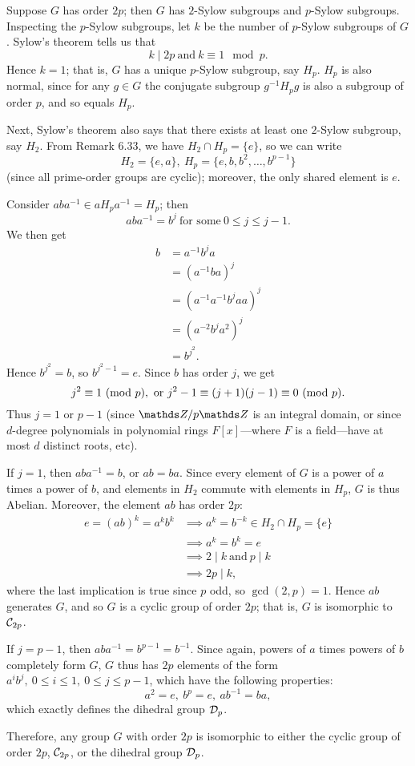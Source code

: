 \documentclass{homework}
\begin{document}
\begin{solution}
  Suppose $G$ has order $2p$; then $G$ has $2$-Sylow subgroups and $p$-Sylow subgroups. Inspecting
  the $p$-Sylow subgroups, let $k$ be the number of $p$-Sylow subgroups of $G$. Sylow's theorem
  tells us that \[
    k\mid 2p ~\text{and}~k\equiv 1\mod{p}
  .\] Hence $k=1$; that is, $G$ has a unique $p$-Sylow subgroup, say $H_p$. $H_p$ is also normal,
  since for any $g\in G$ the conjugate subgroup $g^{-1}H_pg$ is also a subgroup of order $p$, and so
  equals $H_p$.

  Next, Sylow's theorem also says that there exists at least one $2$-Sylow subgroup, say $H_2$. From
  Remark 6.33, we have $H_2\cap H_p=\{ e \}$, so we can write \[
    H_2=\{ e,a \},\ H_p=\{ e,b,b^2,\ldots,b^{p-1} \}
  \] (since all prime-order groups are cyclic); moreover, the only shared element is $e$.

  Consider $aba^{-1}\in aH_pa^{-1}=H_p$; then \[
    aba^{-1}=b^{j}~\text{for some}~0\le j\le j-1
  .\] We then get
  \begin{align*}
    b&= a^{-1}b^ja \\
     &= (a^{-1}ba)^j \\
     &= (a^{-1}a^{-1}b^jaa)^j \\
     &= (a^{-2}b^ja^2)^j \\
     &= b^{j^2}
  .\end{align*}
  Hence $b^{j^2}=b$, so $b^{j^2-1}=e$. Since $b$ has order $j$, we get \[
    j^2\equiv 1\ (\mathrm{mod}\ p), ~\text{or}~j^2-1\equiv (j+1)(j-1)\equiv 0\ (\mathrm{mod}\ p)
  .\] Thus $j=1$ or $p-1$ (since $\Z /p\Z$ is an integral domain, or since $d$-degree polynomials in
  polynomial rings $F[x]$---where $F$ is a field---have at most $d$ distinct roots, etc).

  If $j=1$, then $aba^{-1}=b$, or $ab=ba$. Since every element of $G$ is a power of $a$ times a
  power of $b$, and elements in $H_2$ commute with elements in $H_p$, $G$ is thus Abelian. Moreover,
  the element $ab$ has order $2p$:
  \begin{align*}
    e=(ab)^k=a^kb^k&\implies a^k=b^{-k}\in H_2\cap H_p=\{ e \}\\
                   &\implies a^k=b^k=e\\
                   &\implies 2\mid k~\text{and}~p\mid k\\
                   &\implies 2p\mid k
  ,\end{align*} where the last implication is true since $p$ odd, so $\gcd{(2,p)}=1$. Hence $ab$
  generates $G$, and so $G$ is a cyclic group of order $2p$; that is, $G$ is isomorphic to
  $\mathcal{C}_{2p}$.

  If $j=p-1$, then $aba^{-1}=b^{p-1}=b^{-1}$. Since again, powers of $a$ times powers of $b$
  completely form $G$, $G$ thus has $2p$ elements of the form $a^ib^j,\ 0\le i\le 1,\ 0\le j\le
  p-1$, which have the following properties: \[
    a^2=e,\ b^p=e,\ ab^{-1}=ba
  ,\] which exactly defines the dihedral group $\mathcal{D}_p$.

  Therefore, any group $G$ with order $2p$ is isomorphic to either the cyclic group of order $2p$,
  $\mathcal{C}_{2p}$, or the dihedral group $\mathcal{D}_p$.
\end{solution}
\end{document}

